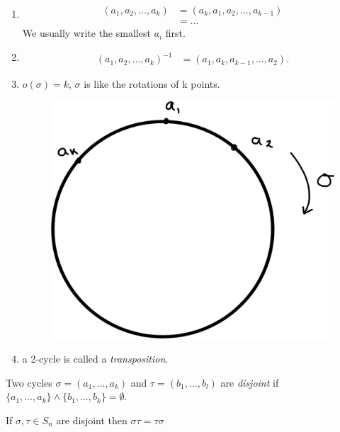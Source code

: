 \begin{remark} \mbox{}
\begin{enumerate}
\def\labelenumi{\roman{enumi}.}
\item
  \begin{align*}
   (a_1, a_2, \ldots, a_k) &= (a_k, a_1, a_2, \ldots, a_{k-1}) \\
   &= \ldots
  \end{align*} We usually write the smallest \(a_i\) first.
\item
  \begin{align*}
  (a_1, a_2, \ldots, a_k)^{-1} &= (a_1, a_k, a_{k-1}, \ldots, a_2).
  \end{align*}
\item
  \(o(\sigma) = k\), \(\sigma\) is like the rotations of k points.
  \begin{figure}
    \centering \includegraphics[width=0.5\linewidth]{figures/02-sigma-graphical}
  \end{figure} 
\item
  a 2-cycle is called a \emph{transposition}.
\end{enumerate}

\end{remark}

\begin{definition}
Two cycles \(\sigma = (a_1, \ldots, a_k)\) and \(\tau = (b_1, \ldots, b_l)\) are \emph{disjoint} if \(\{ a_1, \ldots, a_k \} \land \{ b_1, \ldots, b_k \} = \emptyset\).
\end{definition}

\begin{lemma}
\protect\hypertarget{lem:six}{}\label{lem:six}
If \(\sigma, \tau \in S_n\) are disjoint then \(\sigma \tau = \tau \sigma\)
\end{lemma}

